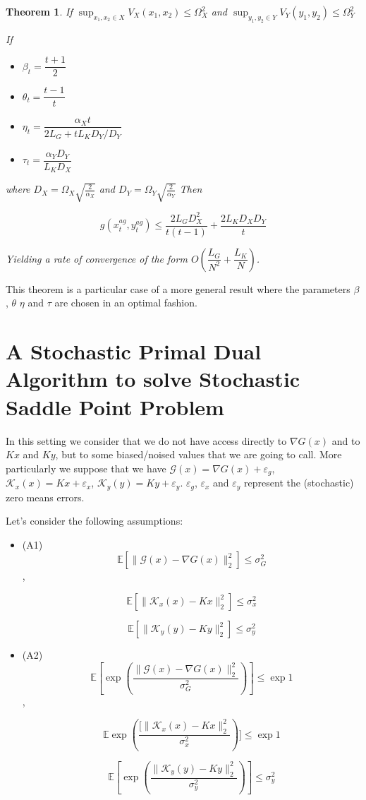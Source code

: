 \documentclass[12pt,reqno]{amsart}
\newtheorem{thm}{Theorem}[section]
\numberwithin{equation}{section}
\begin{document}
\begin{thm}

If $\sup_{x_{1},x_{2} \in X} V_{X}(x_{1},x_{2}) \leq \Omega_{X}^{2}$ and 
$\sup_{y_{1},y_{2} \in Y} V_{Y}(y_{1},y_{2}) \leq \Omega_{Y}^{2}$

If \begin{itemize}
\item $\beta_{t} = \dfrac{t+1}{2}$
\item $\theta_{t} = \dfrac{t-1}{t}$
\item $\eta_{t} = \dfrac{\alpha_{X}t}{2L_{G} + tL_{K}D_{Y}/D_{Y}}$
\item $\tau_{t} = \dfrac{\alpha_{Y}D_{Y}}{L_{K}D_{X}}$
\end{itemize}
where $D_{X} = \Omega_{X}\sqrt{\frac{2}{\alpha_{X}}}$ and $D_{Y} = \Omega_{Y}\sqrt{\frac{2}{\alpha_{Y}}}$
Then

$$
g(x_{t}^{ag},y_{t}^{ag}) \leq \dfrac{2L_{G}D_{X}^{2}}{t(t-1)} + \dfrac{2L_{K}D_{X}D_{Y}}{t}
$$

Yielding a rate of convergence of the form $O(\dfrac{L_{G}}{N^{2}} + \dfrac{L_{K}}{N})$.

\end{thm}


This theorem is a particular case of a more general result where the parameters $\beta$, $\theta$ $\eta$ and $\tau$ are chosen in an optimal fashion.

\section{A Stochastic Primal Dual Algorithm to solve Stochastic Saddle Point Problem}

In this setting we consider that we do not have access directly to $\nabla G(x)$ and to $Kx$ and $Ky$, but to some biased/noised values that we are going to call.
More particularly we suppose that we have $\mathcal{G}(x) = \nabla G(x) + \varepsilon_{g}$, $\mathcal{K}_{x}(x) = Kx + \varepsilon_{x}$, $\mathcal{K}_{y}(y) = Ky + \varepsilon_{y}$.
$\varepsilon_{g}$, $\varepsilon_{x}$ and $\varepsilon_{y}$ represent the (stochastic) zero means errors.

Let's consider the following assumptions:

\begin{itemize}


\item (A1) $$\mathbb{E}[\lVert \mathcal{G}(x) - \nabla G(x) \rVert_{2}^{2}] \leq \sigma_{G}^{2}$$,

$$\mathbb{E}[\lVert \mathcal{K}_{x}(x) - Kx \rVert_{2}^{2}] \leq \sigma_{x}^{2}$$

$$\mathbb{E}[\lVert \mathcal{K}_{y}(y) - Ky \rVert_{2}^{2}] \leq \sigma_{y}^{2}$$

\item (A2) $$\mathbb{E}[\exp(\frac{\lVert \mathcal{G}(x) - \nabla G(x) \rVert_{2}^{2}}{\sigma_{G}^{2}})] \leq \exp{1}$$,

$$\mathbb{E}\exp(\frac{[\lVert \mathcal{K}_{x}(x) - Kx \rVert_{2}^{2}}{\sigma_{x}^{2}})] \leq \exp{1}$$

$$\mathbb{E}[\exp(\dfrac{\lVert \mathcal{K}_{y}(y) - Ky \rVert_{2}^{2}}{\sigma_{y}^{2}})] \leq \sigma_{y}^{2}$$
\end{itemize}
\end{document}
